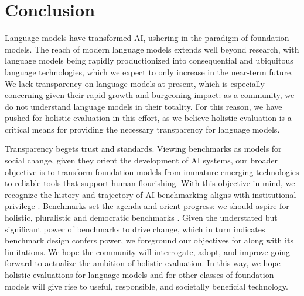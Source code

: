 \hypertarget{conclusion}{\section{Conclusion}}
\label{sec:conclusion}

Language models have transformed AI, ushering in the paradigm of foundation models.
The reach of modern language models extends well beyond research, with language models being rapidly productionized into consequential and ubiquitous language technologies, which we expect to only increase in the near-term future. 
We lack transparency on language models at present, which is especially concerning given their rapid growth and burgeoning impact: as a community, we do not understand language models in their totality.
For this reason, we have pushed for holistic evaluation in this effort, as we believe holistic evaluation is a critical means for providing the necessary transparency for language models.

Transparency begets trust and standards. 
Viewing benchmarks as models for social change, given they orient the development of AI systems, our broader objective is to transform foundation models from immature emerging technologies to reliable tools that support human flourishing. 
With this objective in mind, we recognize the history and trajectory of AI benchmarking aligns with institutional privilege \citep{koch2021reduced}. 
Benchmarks set the agenda and orient progress: we should aspire for holistic, pluralistic and democratic benchmarks \citep{birhane2022values}. 
Given the understated but significant power of benchmarks to drive change, which in turn indicates benchmark design confers power, we foreground our objectives for \benchmarkname along with its limitations. 
We hope the community will interrogate, adopt, and improve \benchmarkname going forward to actualize the ambition of holistic evaluation.
In this way, we hope holistic evaluations for language models and for other classes of foundation models will give rise to useful, responsible, and societally beneficial technology. 